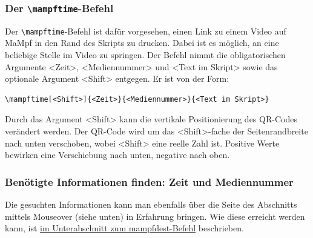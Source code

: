 \documentclass[parskip=off,index=totocnumbered]{scrartcl}
\begin{document}

\subsubsection{Der \texttt{\textbackslash mampftime}-Befehl} \label{subsubsec:time}
Der \verb|\mampftime|-Befehl ist dafür vorgesehen, einen Link zu einem Video auf MaMpf in den Rand des Skripts zu drucken. Dabei ist es möglich, an eine beliebige Stelle im Video zu springen. Der Befehl nimmt die obligatorischen Argumente <Zeit>, <Mediennummer> und <Text im Skript> sowie das optionale Argument <Shift> entgegen. Er ist von der Form:
   \begin{verbatim}
\mampftime[<Shift>]{<Zeit>}{<Mediennummer>}{<Text im Skript>}
   \end{verbatim}
\vspace{-0.5cm}
Durch das Argument <Shift> kann die vertikale Positionierung des QR-Codes verändert werden. Der QR-Code wird um das <Shift>-fache der Seitenrandbreite nach unten verschoben, wobei <Shift> eine reelle Zahl ist. Positive Werte bewirken eine Verschiebung nach unten, negative nach oben.  

\subsubsection*{Benötigte Informationen finden: Zeit und Mediennummer}
Die gesuchten Informationen kann man ebenfalls über die Seite des Abschnitts mittels Mouseover (siehe unten) in Erfahrung bringen. Wie diese erreicht werden kann, ist \hyperref[subsubsec:infos]{im Unterabschnitt zum mampfdest-Befehl} beschrieben.
\vspace{0.4cm}  

\noindent \begin{minipage}{\textwidth}
 \end{minipage}
\vspace{0.1cm}
\end{document}
